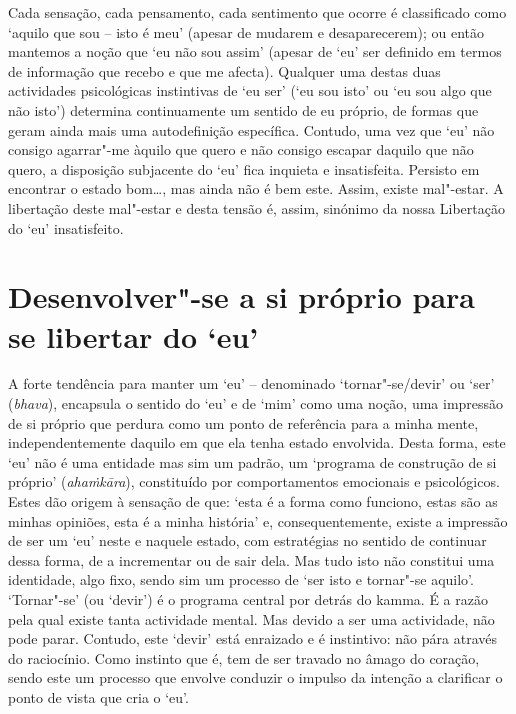 Cada sensação, cada pensamento, cada sentimento que ocorre é classificado como
`aquilo que sou -- isto é meu' (apesar de mudarem e desaparecerem); ou então
mantemos a noção que `eu não sou assim' (apesar de `eu' ser definido em termos
de informação que recebo e que me afecta). Qualquer uma destas duas actividades
psicológicas instintivas de `eu ser' (`eu sou isto' ou `eu sou algo que não
isto') determina continuamente um sentido de eu próprio, de formas que geram
ainda mais uma autodefinição específica. Contudo, uma vez que `eu' não consigo
agarrar"-me àquilo que quero e não consigo escapar daquilo que não quero, a
disposição subjacente do `eu' fica inquieta e insatisfeita. Persisto em
encontrar o estado bom\ldots{}, mas ainda não é bem este. Assim, existe mal"-estar.
A libertação deste mal"-estar e desta tensão é, assim, sinónimo da nossa
Libertação do `eu' insatisfeito.

\section{Desenvolver"-se a si próprio para se libertar do `eu\kern -0.5pt'}

A forte tendência para manter um `eu' -- denominado `tornar"-se/devir' ou `ser'
(\emph{bhava}), encapsula o sentido do `eu' e de `mim' como uma noção, uma
impressão de si próprio que perdura como um ponto de referência para a minha
mente, independentemente daquilo em que ela tenha estado envolvida. Desta forma,
este `eu' não é uma entidade mas sim um padrão, um `programa de construção de si
próprio' (\emph{ahaṁkāra}), constituído por comportamentos emocionais e
psicológicos. Estes dão origem à sensação de que: `esta é a forma como funciono,
estas são as minhas opiniões, esta é a minha história' e, consequentemente,
existe a impressão de ser um `eu' neste e naquele estado, com estratégias no
sentido de continuar dessa forma, de a incrementar ou de sair dela. Mas tudo
isto não constitui uma identidade, algo fixo, sendo sim um processo de `ser isto
e tornar"-se aquilo'. `Tornar"-se' (ou `devir') é o programa central por detrás do
kamma. É a razão pela qual existe tanta actividade mental. Mas devido a ser uma
actividade, não pode parar. Contudo, este `devir' está enraizado e é instintivo:
não pára através do raciocínio. Como instinto que é, tem de ser travado no âmago
do coração, sendo este um processo que envolve conduzir o impulso da intenção a
clarificar o ponto de vista que cria o `eu'.

